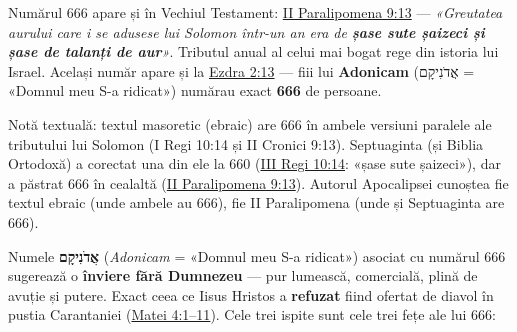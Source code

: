 \documentclass[12pt,a4paper,twoside,openany]{book}
\begin{document}
Numărul 666 apare și în Vechiul Testament: \href{https://bibliaortodoxa.ro/carte.php?id=15\&cap=9\#13}{II Paralipomena 9:13} — \textit{«Greutatea aurului care i se adusese lui Solomon într-un an era de \textbf{șase sute șaizeci și șase de talanți de aur}»}. Tributul anual al celui mai bogat rege din istoria lui Israel. Același număr apare și la \href{https://bibliaortodoxa.ro/carte.php?id=23\&cap=2\#13}{Ezdra 2:13} — fiii lui \textbf{Adonicam} (אֲדֹנִיקָם = «Domnul meu S-a ridicat») numărau exact \textbf{666} de persoane.

Notă textuală: textul masoretic (ebraic) are 666 în ambele versiuni paralele ale tributului lui Solomon (I Regi 10:14 și II Cronici 9:13). Septuaginta (și Biblia Ortodoxă) a corectat una din ele la 660 (\href{https://bibliaortodoxa.ro/carte.php?id=68\&cap=10\#14}{III Regi 10:14}: «șase sute șaizeci»), dar a păstrat 666 în cealaltă (\href{https://bibliaortodoxa.ro/carte.php?id=15\&cap=9\#13}{II Paralipomena 9:13}). Autorul Apocalipsei cunoștea fie textul ebraic (unde ambele au 666), fie II Paralipomena (unde și Septuaginta are 666).

Numele \textbf{אֲדֹנִיקָם} (\textit{Adonicam} = «Domnul meu S-a ridicat») asociat cu numărul 666 sugerează o \textbf{înviere fără Dumnezeu} — pur lumească, comercială, plină de avuție și putere. Exact ceea ce Iisus Hristos a \textbf{refuzat} fiind ofertat de diavol în pustia Carantaniei (\href{https://bibliaortodoxa.ro/carte.php?id=55\&cap=4\#1}{Matei 4:1–11}). Cele trei ispite sunt cele trei fețe ale lui 666:
\end{document}
